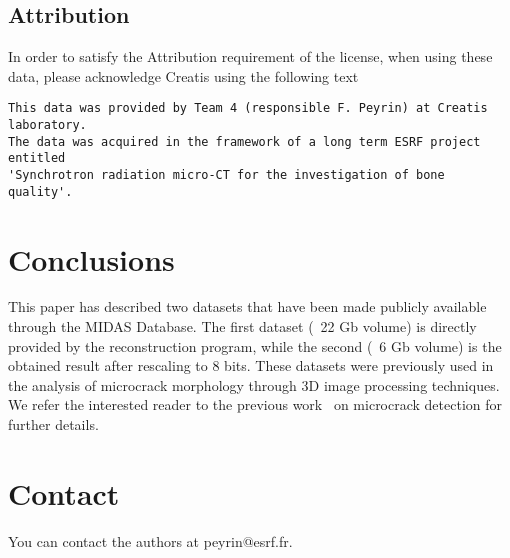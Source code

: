 \documentclass{InsightArticle}
\begin{document}
\subsection{Attribution}

In order to satisfy the Attribution requirement of the license, when using
these data, please acknowledge Creatis using the following text

\begin{verbatim}
This data was provided by Team 4 (responsible F. Peyrin) at Creatis laboratory.
The data was acquired in the framework of a long term ESRF project entitled
'Synchrotron radiation micro-CT for the investigation of bone quality'.
\end{verbatim}

\section{Conclusions}
This paper has described two datasets that have been made publicly available
through the MIDAS Database. The first dataset  (~22 Gb volume) is directly
provided by the reconstruction program, while the second (~6 Gb volume) is the
obtained result after rescaling to 8 bits. These datasets were previously used in
the analysis of microcrack morphology through 3D image processing techniques.
We refer the interested reader to the previous work~\cite{Larrue2011} on
microcrack detection for further details.

\section{Contact}

You can contact the authors at peyrin@esrf.fr.


%
%



\end{document}
